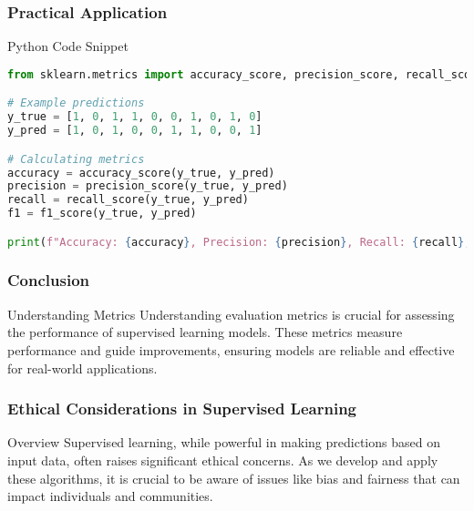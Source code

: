 \documentclass{beamer}
\begin{document}
\begin{frame}[fragile]
    \frametitle{Practical Application}
    \begin{block}{Python Code Snippet}
        \begin{lstlisting}[language=Python]
from sklearn.metrics import accuracy_score, precision_score, recall_score, f1_score

# Example predictions
y_true = [1, 0, 1, 1, 0, 0, 1, 0, 1, 0]
y_pred = [1, 0, 1, 0, 0, 1, 1, 0, 0, 1]

# Calculating metrics
accuracy = accuracy_score(y_true, y_pred)
precision = precision_score(y_true, y_pred)
recall = recall_score(y_true, y_pred)
f1 = f1_score(y_true, y_pred)

print(f"Accuracy: {accuracy}, Precision: {precision}, Recall: {recall}, F1 Score: {f1}")
        \end{lstlisting}
    \end{block}
\end{frame}

\begin{frame}
    \frametitle{Conclusion}
    \begin{block}{Understanding Metrics}
        Understanding evaluation metrics is crucial for assessing the performance of supervised learning models. These metrics measure performance and guide improvements, ensuring models are reliable and effective for real-world applications.
    \end{block}
\end{frame}

\begin{frame}[fragile]
    \frametitle{Ethical Considerations in Supervised Learning}
    \begin{block}{Overview}
        Supervised learning, while powerful in making predictions based on input data, often raises significant ethical concerns. 
        As we develop and apply these algorithms, it is crucial to be aware of issues like bias and fairness that can impact individuals and communities.
    \end{block}
\end{frame}
\end{document}
